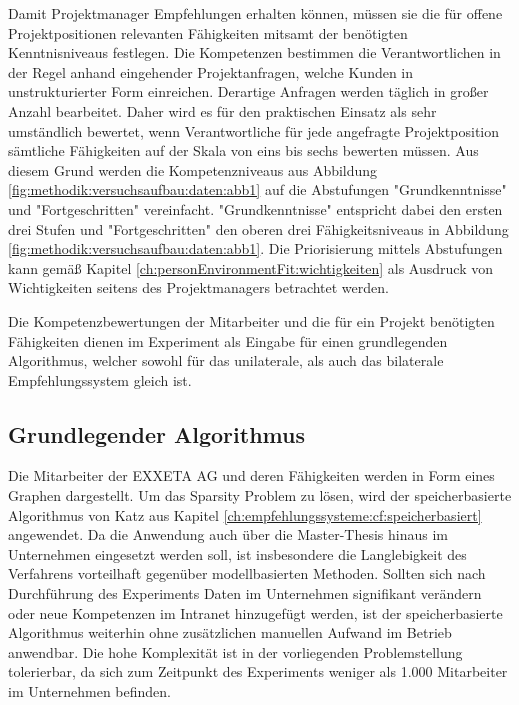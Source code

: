 Damit Projektmanager Empfehlungen erhalten können, müssen sie die für offene Projektpositionen relevanten Fähigkeiten mitsamt der benötigten Kenntnisniveaus festlegen. Die Kompetenzen bestimmen die Verantwortlichen in der Regel anhand eingehender Projektanfragen, welche Kunden in unstrukturierter Form einreichen. Derartige Anfragen werden täglich in großer Anzahl bearbeitet. Daher wird es für den praktischen Einsatz als sehr umständlich bewertet, wenn Verantwortliche für jede angefragte Projektposition sämtliche Fähigkeiten auf der Skala von eins bis sechs bewerten müssen. Aus diesem Grund werden die Kompetenzniveaus aus Abbildung \ref{fig:methodik:versuchsaufbau:daten:abb1} auf die Abstufungen "Grundkenntnisse" und "Fortgeschritten" vereinfacht. "Grundkenntnisse" entspricht dabei den ersten drei Stufen und "Fortgeschritten" den oberen drei Fähigkeitsniveaus in Abbildung \ref{fig:methodik:versuchsaufbau:daten:abb1}. Die Priorisierung mittels Abstufungen kann gemäß Kapitel \ref{ch:personEnvironmentFit:wichtigkeiten} als Ausdruck von Wichtigkeiten seitens des Projektmanagers betrachtet werden.

Die Kompetenzbewertungen der Mitarbeiter und die für ein Projekt benötigten Fähigkeiten dienen im Experiment als Eingabe für einen grundlegenden Algorithmus, welcher sowohl für das unilaterale, als auch das bilaterale Empfehlungssystem gleich ist.

\subsection{Grundlegender Algorithmus}
\label{ch:methodik:versuchsaufbau:grundlegend}
Die Mitarbeiter der EXXETA AG und deren Fähigkeiten werden in Form eines Graphen dargestellt. Um das Sparsity Problem zu lösen, wird der speicherbasierte Algorithmus von Katz aus Kapitel \ref{ch:empfehlungssysteme:cf:speicherbasiert} angewendet. Da die Anwendung auch über die Master-Thesis hinaus im Unternehmen eingesetzt werden soll, ist insbesondere die Langlebigkeit des Verfahrens vorteilhaft gegenüber modellbasierten Methoden. Sollten sich nach Durchführung des Experiments Daten im Unternehmen signifikant verändern oder neue Kompetenzen im Intranet hinzugefügt werden, ist der speicherbasierte Algorithmus weiterhin ohne zusätzlichen manuellen Aufwand im Betrieb anwendbar. Die hohe Komplexität ist in der vorliegenden Problemstellung tolerierbar, da sich zum Zeitpunkt des Experiments weniger als 1.000 Mitarbeiter im Unternehmen befinden.

